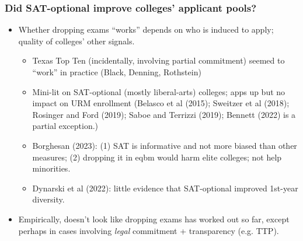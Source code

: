 \documentclass[11pt, aspectratio=169]{beamer}
\theoremstyle{plain}
\theoremstyle{plain}
\theoremstyle{plain}
\theoremstyle{plain}
\begin{document}
\begin{frame}\frametitle{Did SAT-optional improve colleges' applicant pools?}
    \begin{itemize}
        \item Whether dropping exams ``works'' depends on who is induced to apply; quality of colleges' other signals. \pause
        \begin{itemize}   %
            \item Texas Top Ten (incidentally, involving partial commitment) seemed to ``work'' in practice (Black, Denning, Rothstein) \pause
            \item Mini-lit on SAT-optional (mostly liberal-arts) colleges; apps up but no impact on URM enrollment (Belasco et al (2015); Sweitzer et al (2018); Rosinger and Ford (2019); Saboe and Terrizzi (2019); Bennett (2022) is a partial exception.) \pause
            \item Borghesan (2023): (1) SAT is informative and not more biased than other measures; (2) dropping it in eqbm would harm elite colleges; not help minorities.
            \item Dynarski et al (2022): little evidence that SAT-optional improved 1st-year diversity. 
        \end{itemize}
        \item Empirically, doesn't look like dropping exams has worked out so far, except perhaps in cases involving \emph{legal} commitment + transparency (e.g. TTP).
    \end{itemize}
\end{frame}
\end{document}
